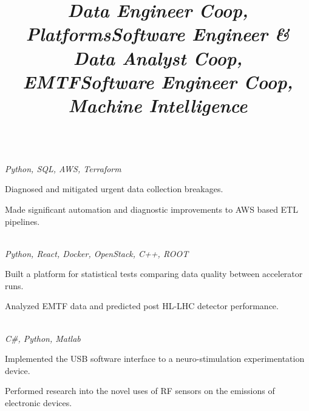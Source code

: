 \documentclass[margin,line,11pt,letterpaper]{style}
\begin{document}
\begin{resume}
    \title{\textit{Data Engineer Coop, Platforms}}
    \begin{position}
        \vspace{-3mm}\\
        \emph{Python, SQL, AWS, Terraform}
        \begin{list2}
            \item Diagnosed and mitigated urgent data collection breakages. 
            \item Made significant automation and diagnostic improvements to AWS based ETL pipelines.
        \end{list2}
    \end{position}

    \title{\textit{Software Engineer \& Data Analyst Coop, EMTF}}
    \begin{position}
        \vspace{-3mm}\\
        \emph{Python, React, Docker, OpenStack, C++, ROOT}
        \begin{list2}
            \item Built a platform for statistical tests comparing data quality between accelerator runs.
            \item Analyzed EMTF data and predicted post HL-LHC detector performance.
        \end{list2}
    \end{position}

    \title{\textit{Software Engineer Coop, Machine Intelligence}}
    \begin{position}
        \vspace{-3mm}\\
        \emph{C\#, Python, Matlab}
        \begin{list2}
            \item Implemented the USB software interface to a neuro-stimulation experimentation device.
            \item Performed research into the novel uses of RF sensors on the emissions of electronic devices.
        \end{list2}
    \end{position}
    

\end{resume}
\end{document}
